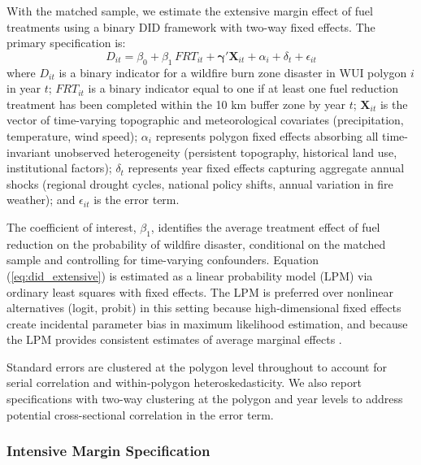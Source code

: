 \documentclass[12pt, letterpaper]{article}
\begin{document}
With the matched sample, we estimate the extensive margin effect of fuel treatments using a binary DID framework with two-way fixed effects. The primary specification is:
\begin{equation}
    D_{it} = \beta_0 + \beta_1 \, FRT_{it} + \boldsymbol{\gamma}' \mathbf{X}_{it} + \alpha_i + \delta_t + \epsilon_{it}
    \label{eq:did_extensive}
\end{equation}
where $D_{it}$ is a binary indicator for a wildfire burn zone disaster in WUI polygon $i$ in year $t$; $FRT_{it}$ is a binary indicator equal to one if at least one fuel reduction treatment has been completed within the 10 km buffer zone by year $t$; $\mathbf{X}_{it}$ is the vector of time-varying topographic and meteorological covariates (precipitation, temperature, wind speed); $\alpha_i$ represents polygon fixed effects absorbing all time-invariant unobserved heterogeneity (persistent topography, historical land use, institutional factors); $\delta_t$ represents year fixed effects capturing aggregate annual shocks (regional drought cycles, national policy shifts, annual variation in fire weather); and $\epsilon_{it}$ is the error term.

The coefficient of interest, $\beta_1$, identifies the average treatment effect of fuel reduction on the probability of wildfire disaster, conditional on the matched sample and controlling for time-varying confounders. Equation (\ref{eq:did_extensive}) is estimated as a linear probability model (LPM) via ordinary least squares with fixed effects. The LPM is preferred over nonlinear alternatives (logit, probit) in this setting because high-dimensional fixed effects create incidental parameter bias in maximum likelihood estimation, and because the LPM provides consistent estimates of average marginal effects \citep{angrist2009}.

Standard errors are clustered at the polygon level throughout to account for serial correlation and within-polygon heteroskedasticity. We also report specifications with two-way clustering at the polygon and year levels to address potential cross-sectional correlation in the error term.

\subsubsection{Intensive Margin Specification}
\end{document}
